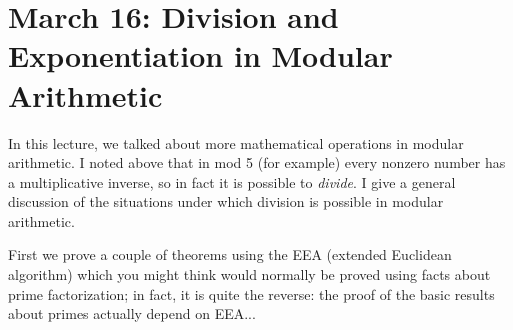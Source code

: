 \documentclass[12pt]{article}
\begin{document}
\section{March 16:   Division and Exponentiation in Modular Arithmetic}

In this lecture, we talked about more mathematical operations in modular arithmetic.  I noted above that in mod 5 (for example) every nonzero number has a multiplicative inverse, so in fact it is possible to {\em divide\/}.  I give a general discussion of the situations under which division is possible in modular arithmetic.

First we prove a couple of theorems using the EEA (extended Euclidean algorithm) which you might think would normally be proved using facts about prime factorization;  in fact, it is quite the reverse:  the proof of the basic results about primes actually depend on EEA...
\end{document}
